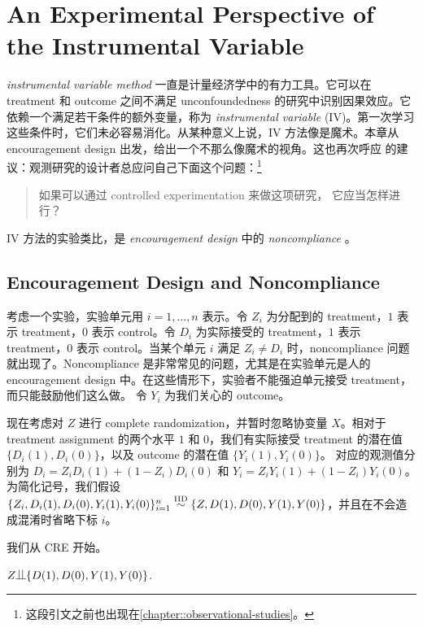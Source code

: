  
\chapter{An Experimental Perspective of the Instrumental Variable}
 \label{chapter::iv-experiment}



{\it instrumental variable method} 一直是计量经济学中的有力工具。它可以在 treatment 和 outcome 之间不满足 unconfoundedness 的研究中识别因果效应。它依赖一个满足若干条件的额外变量，称为 {\it instrumental variable} (IV)。第一次学习这些条件时，它们未必容易消化。从某种意义上说，IV 方法像是魔术。本章从 encouragement design 出发，给出一个不那么像魔术的视角。这也再次呼应 \citet{dorn1953philosophy} 的建议：观测研究的设计者总应问自己下面这个问题：\footnote{这段引文之前也出现在\cref{chapter::observational-studies}。}
\begin{quote}
如果可以通过 controlled experimentation 来做这项研究，
它应当怎样进行？
\end{quote} 
IV 方法的实验类比，是 {\it encouragement design} 中的 {\it noncompliance} \citep{zelen1979new, powers1984effects, holland1986statistics}。 



\section{Encouragement Design and Noncompliance}

考虑一个实验，实验单元用 $i = 1,\ldots, n$ 表示。令 $Z_i$ 为分配到的 treatment，$1$ 表示 treatment，$0$ 表示 control。令 $D_i$ 为实际接受的 treatment，$1$ 表示 treatment，$0$ 表示 control。当某个单元 $i$ 满足 $Z_i \neq D_i$ 时，noncompliance 问题就出现了。Noncompliance 是非常常见的问题，尤其是在实验单元是人的 encouragement design 中。在这些情形下，实验者不能强迫单元接受 treatment，而只能鼓励他们这么做。
令 $Y_i$ 为我们关心的 outcome。

现在考虑对 $Z$ 进行 complete randomization，并暂时忽略协变量 $X$。相对于 treatment assignment 的两个水平 $1$ 和 $0$，我们有实际接受 treatment 的潜在值 $\{  D_i(1), D_i(0) \}$，以及 outcome 的潜在值 $\{ Y_i(1), Y_i(0)  \}$。
对应的观测值分别为 $D_i = Z_i D_i(1) + (1-Z_i) D_i(0)$ 和 $Y_i = Z_i Y_i(1) + (1-Z_i) Y_i(0)$。
为简化记号，我们假设 $\{  Z_i, D_i(1), D_i(0) ,Y_i(1), Y_i(0)  \}_{i=1}^n \stackrel{\textup{IID}}{\sim} \{  Z, D(1), D(0) ,Y(1), Y(0)  \}$，并且在不会造成混淆时省略下标 $i$。


我们从 CRE 开始。
\begin{assumption}[randomization]
\label{assume::random}
$Z\ind \{D(1), D(0) ,Y(1), Y(0)   \}$. 
\end{assumption}

